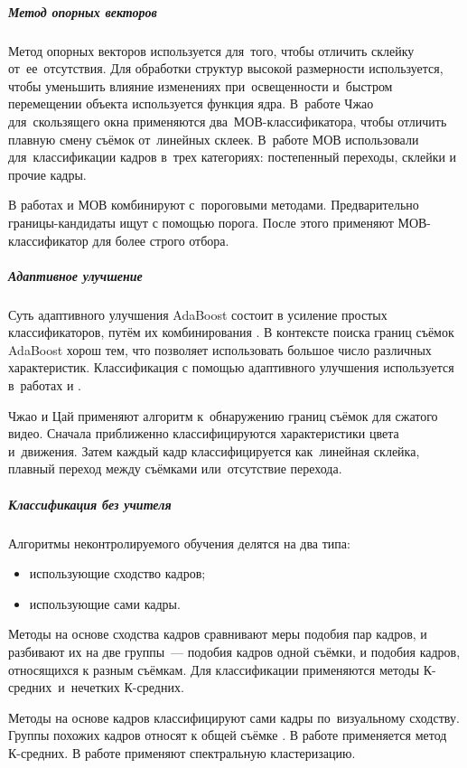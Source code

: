 \subparagraph{Метод опорных векторов}

Метод опорных векторов \cite{Ngo:2003} \cite{Camara-Chavez:2007} \cite{Matsumoto:2006}
используется для~того, чтобы отличить склейку от~ее~отсутствия.
Для обработки структур высокой размерности используется,
чтобы уменьшить влияние изменениях при~освещенности
и~быстром перемещении объекта используется
функция ядра.
В~работе Чжао \cite{Zhao:2007} для~скользящего окна
применяются два~МОВ-классификатора,
чтобы отличить плавную смену съёмок от~линейных склеек.
В~работе \cite{Ling:2008} МОВ использовали для~классификации кадров
в~трех категориях: постепенный переходы, склейки и прочие кадры.

В работах \cite{Yuan:2007} и \cite{Liu:2006} МОВ
комбинируют с~пороговыми методами.
Предварительно границы-кандидаты ищут с помощью порога.
После этого применяют МОВ-классификатор для более строго отбора.

\subparagraph{Адаптивное улучшение}

Суть адаптивного улучшения AdaBoost состоит в усиление простых классификаторов,
путём их комбинирования \cite{Freund:1995}.
В контексте поиска границ съёмок AdaBoost хорош тем,
что позволяет использовать большое число различных характеристик.
Классификация с помощью адаптивного улучшения используется
в~работах \cite{Zhao:2006} и \cite{Herout:2007}.

Чжао и Цай \cite{Zhao:2006} применяют алгоритм к~обнаружению границ
съёмок для сжатого видео. Сначала приближенно классифицируются
характеристики цвета и~движения.
Затем каждый кадр классифицируется
как~линейная склейка, плавный переход между съёмками
или~отсутствие перехода.


\subparagraph{Классификация без учителя}

Алгоритмы  неконтролируемого обучения делятся на два типа:
\begin{itemize}
    \item использующие сходство кадров;
    \item использующие сами кадры.
\end{itemize}

Методы на основе сходства кадров сравнивают меры подобия пар кадров,
и разбивают их на две группы~— подобия кадров одной съёмки,
и подобия кадров, относящихся к разным съёмкам.
Для классификации применяются методы
К-средних\ и~нечетких К-средних.

Методы на основе кадров классифицируют сами кадры
по~визуальному сходству.
Группы похожих кадров относят к общей съёмке \cite{Chang:2008}.
В работе \cite{Lu:2004} применяется метод К-средних.
В работе \cite{Damnjanovic:2007} применяют
спектральную кластеризацию.

